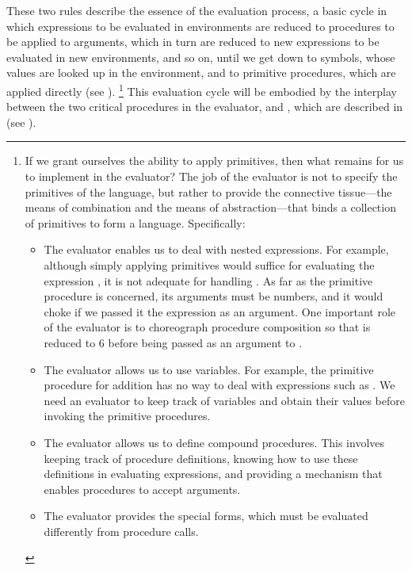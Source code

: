 These two rules describe the essence of the evaluation process, a basic cycle in which expressions to be evaluated in environments are reduced to procedures to be applied to arguments, which in turn are reduced to new expressions to be evaluated in new environments, and so on, until we get down to symbols, whose values are looked up in the environment, and to primitive procedures, which are applied directly (see ).%
\footnote{
	If we grant ourselves the ability to apply primitives, then what remains for us to implement in the evaluator?
The job of the evaluator is not to specify the primitives of the language, but rather to provide the connective tissue---the means of combination and the means of abstraction---that binds a collection of primitives to form a language.
Specifically:
\begin{itemize}

	\item
		The evaluator enables us to deal with nested expressions.
		For example, although simply applying primitives would suffice for evaluating the expression , it is not adequate for handling .
		As far as the primitive procedure \code{+} is concerned, its arguments must be numbers, and it would choke if we passed it the expression  as an argument.
		One important role of the evaluator is to choreograph procedure composition so that  is reduced to 6 before being passed as an argument to \code{+}.

	\item
		The evaluator allows us to use variables.
		For example, the primitive procedure for addition has no way to deal with expressions such as .
		We need an evaluator to keep track of variables and obtain their values before invoking the primitive procedures.

	\item
		The evaluator allows us to define compound procedures.
		This involves keeping track of procedure definitions, knowing how to use these definitions in evaluating expressions, and providing a mechanism that enables procedures to accept arguments.

	\item
		The evaluator provides the special forms, which must be evaluated differently
	from procedure calls.

\end{itemize}
}
This evaluation cycle will be embodied by the interplay between the two critical procedures in the evaluator,  and , which are described in  (see ).

